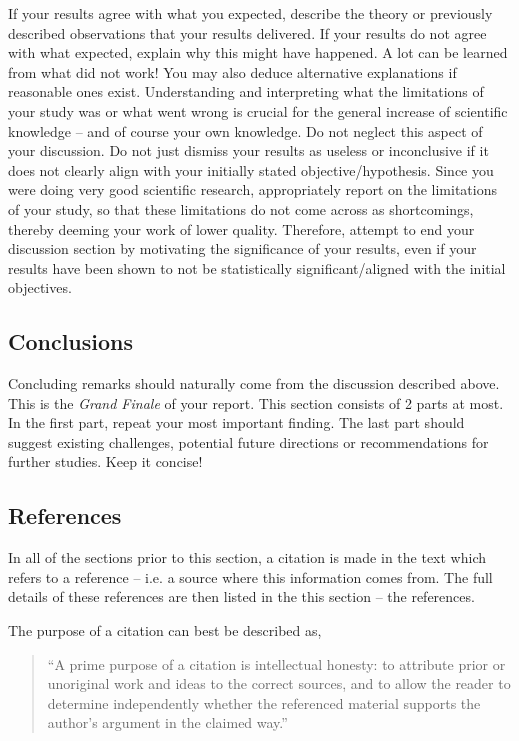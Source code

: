 \documentclass[../main.tex]{subfiles}
\begin{document}
If your results agree with what you expected, describe the theory
or previously described observations that your results delivered.
If your results do not agree with what expected, explain why this
might have happened. A lot can be learned from what
did not work! You may also deduce alternative explanations if reasonable
ones exist. Understanding and interpreting what the limitations of
your study was or what went wrong is crucial for the general increase of scientific
knowledge -- and of course your own knowledge. Do not neglect this aspect of your discussion.
Do not just dismiss your results as useless or inconclusive if it does
not clearly align with your initially stated objective/hypothesis.
Since you were doing very good scientific research, appropriately
report on the limitations of your study, so that these limitations do not come across
as shortcomings, thereby deeming your work of lower quality. Therefore, attempt
to end your discussion section by motivating the significance of your
results, even if your results have been shown to not be statistically significant/aligned with the initial objectives.


\subsection{Conclusions}
\label{sec:Conclusions}

Concluding remarks should naturally come from the discussion described
above. This is the \textit{Grand Finale} of your report. This section consists of 2 parts at most. In the first part, repeat your most important finding. The last part should 
suggest existing challenges, potential future directions or recommendations
for further studies. Keep it concise!


\subsection{References}
\label{sec:References}

In all of the sections prior to this section, a citation is made in the text which refers to a reference -- i.e. a source where this information comes from. The full details of these references are then listed in the this section -- the references.

The purpose of a citation can best be described as,
\begin{quote}
\textquotedblleft{}A prime purpose of a citation is intellectual honesty: to attribute prior or unoriginal work and ideas to the correct sources, and to allow the reader to determine independently whether the referenced material supports the author's argument in the claimed way.\textquotedblright{}\cite{citation}
\end{quote}
\end{document}
